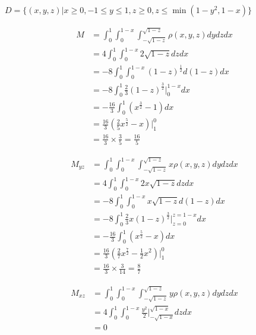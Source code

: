 \documentclass{article}
\begin{document}
  $D = \{ (x, y, z) | x \geq 0, -1 \leq y \leq 1, z \geq 0, z \leq \min(1-y^2, 1-x) \}$

  $$\begin{aligned}
    M &= \int_0^1 \int_0^{1-x} \int_{-\sqrt{1-z}}^{\sqrt{1-z}} \rho(x, y, z) dy dz dx  \\
    &= 4 \int_0^1 \int_0^{1-x} 2\sqrt{1-z} dz dx \\
    &= -8 \int_0^1 \int_0^{1-x} (1-z)^{\frac 1 2} d(1-z) dx \\
    &= -8\int_0^1  \frac 2 3 (1-z)^{\frac 3 2}  \biggl|_0^{1-x} dx \\
    &= -\frac{16}{3} \int_0^1 (x^{\frac 3 2} - 1) dx \\
    &= \frac{16}{3} (\frac 2 5 x^{\frac 5 2} - x) \biggl|_1^0 \\
    &= \frac{16}{3} \times \frac{3}{5} = \frac{16}{5}
  \end{aligned}$$

  $$\begin{aligned}
    M_{yz} &= \int_0^1 \int_0^{1-x} \int_{-\sqrt{1-z}}^{\sqrt{1-z}} x \rho(x, y, z) dy dz dx \\
    &= 4 \int_0^1 \int_0^{1-x} 2x\sqrt{1-z} dz dx \\
    &= -8\int_0^1 \int_0^{1-x} x\sqrt{1-z} d(1-z) dx \\
    &= -8\int_0^1 \frac 2 3 x (1-z)^{\frac 3 2} \biggl|_{z=0}^{z=1-x} dx \\
    &= -\frac{16}{3} \int_0^1 (x^{\frac 5 2} - x) dx \\
    &= \frac{16}{3} (\frac 2 7 x^{\frac 7 2} - \frac 1 2 x^2)\biggl|_1^0 \\
    &= \frac{16}{3} \times \frac{3}{14} = \frac 8 7
  \end{aligned}$$

  $$\begin{aligned}
    M_{xz} &= \int_0^1 \int_0^{1-x} \int_{-\sqrt{1-z}}^{\sqrt{1-z}} y \rho(x, y, z) dy dz dx \\
    &= 4\int_0^1 \int_0^{1-x} \frac{y^2}{2}\biggl|_{-\sqrt{1-x}}^{\sqrt{1-x}} dz dx \\
    &= 0
  \end{aligned}$$
\end{document}
